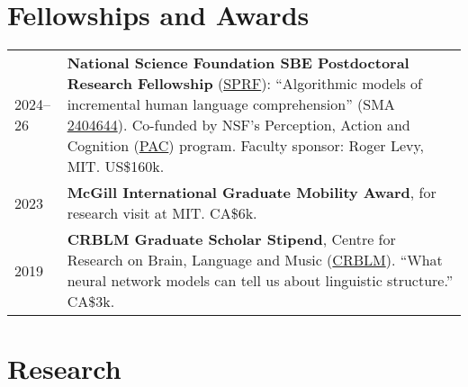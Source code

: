 \documentclass[11pt,a4paper]{article}
\begin{document}
  \section{Fellowships and Awards}
  \begin{longtable}{p{1.7cm}|p{15cm}}
    \textsc{2024--26}&%
      \textbf{National Science Foundation SBE Postdoctoral Research Fellowship} (\href{https://new.nsf.gov/funding/opportunities/sbe-postdoctoral-research-fellowships-sprf}{SPRF}): ``Algorithmic models of incremental human language comprehension''
      (SMA \href{https://www.nsf.gov/awardsearch/showAward?AWD_ID=2404644&}{2404644}).
      Co-funded by NSF's Perception, Action and Cognition (\href{https://new.nsf.gov/funding/opportunities/perception-action-cognition-pac}{PAC}) program.
      Faculty sponsor: Roger Levy, MIT\@.
      US\$160k.\\
    \textsc{2023}&%
      \textbf{McGill International Graduate Mobility Award},
      for research visit at MIT\@. CA\$6k.\\
    \textsc{2019}&%
      \textbf{CRBLM Graduate Scholar Stipend}, Centre for Research on Brain, Language
      and Music (\href{https://crblm.ca/}{CRBLM}). ``What neural network models
      can tell us about linguistic structure.'' CA\$3k.\\
  \end{longtable}


  \section{Research}
\end{document}

